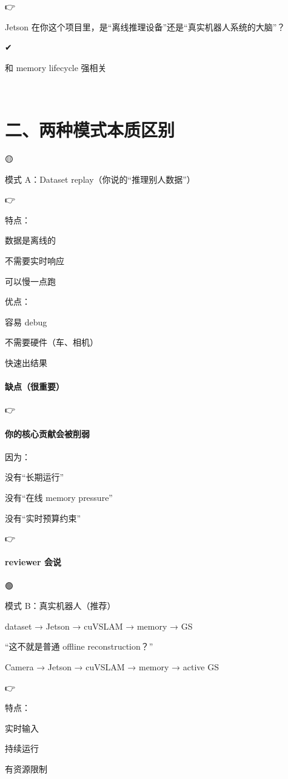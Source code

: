 \documentclass[12pt]{article}
\begin{document}
👉

Jetson 在你这个项目里，是“离线推理设备”还是“真实机器人系统的大脑”？

✔

和 memory lifecycle 强相关

🧠

\section{二、两种模式本质区别}
🟡

模式 A：Dataset replay（你说的“推理别人数据”）

👉

特点：

数据是离线的

不需要实时响应

可以慢一点跑

优点：

容易 debug

不需要硬件（车、相机）

快速出结果

\paragraph{缺点（很重要）}
👉

\paragraph{你的核心贡献会被削弱}
因为：

没有“长期运行”

没有“在线 memory pressure”

没有“实时预算约束”

👉

\paragraph{reviewer 会说}
🟢

模式 B：真实机器人（推荐）

dataset → Jetson → cuVSLAM → memory → GS

“这不就是普通 offline reconstruction？”

Camera → Jetson → cuVSLAM → memory → active GS

👉

特点：

实时输入

持续运行

有资源限制
\end{document}
